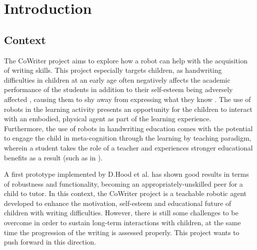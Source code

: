 \chapter{Introduction} \label{chap:intro}

\section{Context} \label{sect:thefirst}

The CoWriter project aims to explore how a robot can help with the acquisition of writing skills. This project especially targets children, as handwriting difficulties in children at an early age often negatively affects the academic performance of the students \cite{christensen2005role} in addition to their self-esteem being adversely affected \cite{malloy1995handwriting}, causing them to shy away from expressing what they know \cite{medwell2008handwriting}. The use of robots in the learning activity presents an opportunity for the children to interact with an embodied, physical agent as part of the learning experience.
Furthermore, the use of robots in handwriting education comes with the potential to engage the child in meta-cognition through the learning by teaching paradigm, wherein a student takes the role of a teacher and experiences stronger educational benefits as a result (such as in \cite{palinscar1984reciprocal}).

A first prototype implemented by D.Hood et al. \cite{hood2015children} has shown good results in terms of robustness and functionality, becoming an appropriately-unskilled peer for a child to tutor. In this context, the CoWriter project is a teachable robotic agent developed to enhance the motivation, self-esteem and educational future of children with writing difficulties. However, there is still some challenges to be overcome in order to sustain long-term interactions with children, at the same time the progression of the writing is assessed properly. This project wants to push forward in this direction.

